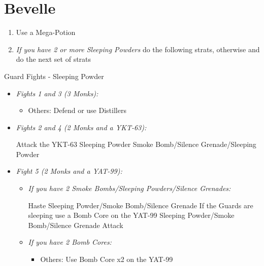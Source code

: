 \chapter{Bevelle}
\begin{enumerate}
    \item Use a Mega-Potion
    \item \textit{If you have 2 or more Sleeping Powders} do the following strats, otherwise \formation{\tidus}{\rikku}{\lulu} and do the next set of strats
\end{enumerate}
\begin{battle}{Guard Fights - Sleeping Powder}
    \begin{itemize}
        \item \textit{Fights 1 and 3 (3 Monks):}
        \begin{itemize}
            \tidusf Attack
            \item Others: Defend or use Distillers
        \end{itemize}
        \item \textit{Fights 2 and 4 (2 Monks and a YKT-63):}
        \begin{itemize}
            \tidusf Attack the YKT-63
            \rikkuf Sleeping Powder
            \kimahrif Smoke Bomb/Silence Grenade/Sleeping Powder
        \end{itemize}
        \item \textit{Fight 5 (2 Monks and a YAT-99):}
        \begin{itemize}
            \item \textit{If you have 2 Smoke Bombs/Sleeping Powders/Silence Grenades:}
            \begin{itemize}
                \tidusf Haste \rikku
                \rikkuf Sleeping Powder/Smoke Bomb/Silence Grenade
                \rikkuf If the Guards are sleeping use a Bomb Core on the YAT-99
                \rikkuf Sleeping Powder/Smoke Bomb/Silence Grenade
                \tidusf Attack
            \end{itemize}
            \item \textit{If you have 2 Bomb Cores:}
            \begin{itemize}
                \tidusf Attack the Monks
                \item Others: Use Bomb Core x2 on the YAT-99
            \end{itemize}
        \end{itemize}
    \end{itemize}
\end{battle}
